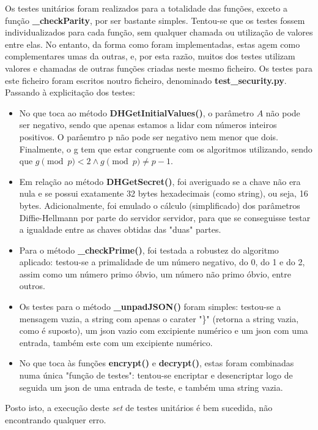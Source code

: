 \documentclass{report}
\begin{document}
Os testes unitários foram realizados para a totalidade das funções, exceto a função \textbf{\_checkParity}, por ser bastante simples.\newline
Tentou-se que os testes fossem individualizados para cada função, sem qualquer chamada ou utilização de valores entre elas. No entanto, da forma como foram implementadas, estas agem como complementares umas da outras, e, por esta razão, muitos dos testes utilizam valores e chamadas de outras funções criadas neste mesmo ficheiro.\newline
Os testes para este ficheiro foram escritos noutro ficheiro, denominado \textbf{test\_security.py}.\newline
Passando à explicitação dos testes:
\begin{itemize}
\item No que toca ao método \textbf{DHGetInitialValues()}, o parâmetro $A$ não pode ser negativo, sendo que apenas estamos a lidar com números inteiros positivos. O parâemtro p não pode ser negativo nem menor que dois. Finalmente, o g tem que estar congruente com os algoritmos utilizando, sendo que $g\pmod{p} < 2\land g\pmod{p}\neq p-1$.
\item Em relação ao método \textbf{DHGetSecret()}, foi averiguado se a chave não era nula e se possui exatamente 32 bytes hexadecimais (como string), ou seja, 16 bytes. Adicionalmente, foi emulado o cálculo (simplificado) dos parâmetros Diffie-Hellmann por parte do servidor servidor, para que se conseguisse testar a igualdade entre as chaves obtidas das "duas" partes.
\item Para o método \textbf{\_checkPrime()}, foi testada a robustez do algoritmo aplicado: testou-se a primalidade de um número negativo, do 0, do 1 e do 2, assim como um número primo óbvio, um número não primo óbvio, entre outros.
\item Os testes para o método \textbf{\_unpadJSON()} foram simples: testou-se a mensagem vazia, a string com apenas o carater "\}" (retorna a string vazia, como é suposto), um \ac{json} vazio com excipiente numérico e um \ac{json} com uma entrada, também este com um excipiente numérico.
\item No que toca às funções \textbf{encrypt()} e \textbf{decrypt()}, estas foram combinadas numa única "função de testes": tentou-se encriptar e desencriptar logo de seguida um json de uma entrada de teste, e também uma string vazia.
\end{itemize}
Posto isto, a execução deste \textit{set} de testes unitários é bem sucedida, não encontrando qualquer erro.
\end{document}
